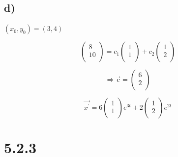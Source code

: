 \documentclass[12pt]{article}
\begin{document}
\subsection*{d)}
\((x_0, y_0) = (3,4)\)

\begin{displaymath}
  \left(
  \begin{array}{c}
    8\\
    10\\
  \end{array}
  \right)
  = 
  c_1
  \left(
  \begin{array}{c}
    1\\
    1\\
  \end{array}
  \right)
  + c_2
  \left(
  \begin{array}{c}
    1\\
    2\\
  \end{array}
  \right)
\end{displaymath}

\begin{displaymath}
  \Rightarrow
  \vec{c} = 
  \left(
   \begin{array}{c}
     6\\
     2\\
   \end{array}
   \right)
\end{displaymath}

\begin{displaymath}
  \vec{x^{'}} = 
  6
  \left(
  \begin{array}{c}
    1\\
    1\\
  \end{array}
  \right)
  e^{3t}
  + 2
  \left(
  \begin{array}{c}
    1\\
    2\\
  \end{array}
  \right)
  e^{2t}
\end{displaymath}

\section*{5.2.3}
\end{document}
